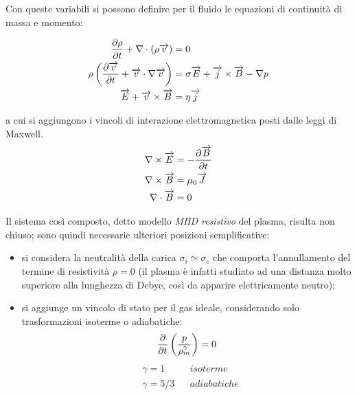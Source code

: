 Con queste variabili si possono definire per il fluido le equazioni di
continuità di massa e momento:



\begin{align}
\label{eq:mhd_mass_continuity}
\frac{\partial \rho}{\partial t} + \nabla \cdot (\rho \overrightarrow{v}) &= 0 \\ 
\label{eq:mhd_moment_continuity}
\rho \left(\frac{\partial \overrightarrow{v}}{\partial t} + \overrightarrow{v} \cdot \nabla \overrightarrow{v} \right) &=
\sigma \overrightarrow{E} + \overrightarrow{j} \times \overrightarrow{B} - \nabla p \\
\label{eq:mhd_ohm}
\overrightarrow{E} + \overrightarrow{v} \times \overrightarrow{B} &= \eta \overrightarrow{j} 
\end{align}

a cui si aggiungono i vincoli di interazione elettromagnetica posti
dalle leggi di Maxwell.
\begin{align}
\nabla \times \overrightarrow{E} &= -\frac{\partial \overrightarrow{B}}{\partial t} \\
\label{eq:ampere}
\nabla \times \overrightarrow{B} &= \mu_0 \overrightarrow{J} \\
\nabla \cdot \overrightarrow{B} &= 0
\end{align}

Il sistema così composto, detto modello \emph{MHD resistivo} del plasma,
risulta non chiuso; sono quindi necessarie ulteriori posizioni
semplificative:

\begin{itemize}
\item si considera la neutralità della carica $\sigma_i \simeq \sigma_e$
      che comporta l'annullamento del termine di resistività $\rho = 0$
      (il plasma è infatti studiato ad una distanza molto superiore alla
      lunghezza di Debye, così da apparire elettricamente neutro);
\item
     si aggiunge un vincolo di stato per il gas ideale, considerando solo
     trasformazioni isoterme o adiabatiche:
     \begin{equation}
     \frac{\partial }{\partial t} \left( \frac{p}{\rho_m^\gamma} \right) = 0
     \end{equation}
     \begin{align}
      & \gamma = 1 && isoterme \\
      & \gamma = 5/3 && adiabatiche
     \end{align}
\end{itemize}

